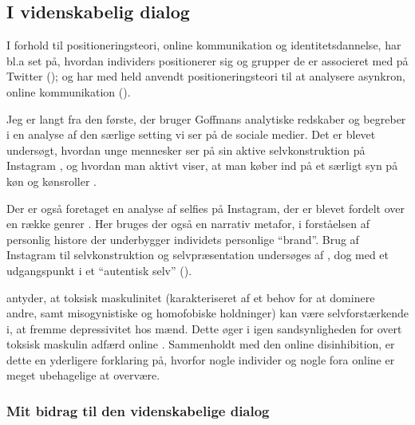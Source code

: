 \subsection{I videnskabelig dialog}

I forhold til positioneringsteori, online kommunikation og 
identitetsdannelse, har bl.a 
\citeauthor{lopezlongTweetingChoirReligious2012} set på, hvordan 
individers positionerer sig og grupper de er associeret med på 
Twitter (\citeyear{lopezlongTweetingChoirReligious2012}); og 
\citeauthor{dennenFacilitatorPresenceIdentity2011} har med held 
anvendt positioneringsteori til at analysere asynkron, online 
kommunikation (\citeyear{dennenFacilitatorPresenceIdentity2011}).

Jeg er langt fra den første, der bruger Goffmans analytiske 
redskaber og begreber i en analyse af den særlige setting vi ser 
på de sociale medier. Det er blevet undersøgt, hvordan unge 
mennesker ser på sin aktive selvkonstruktion på Instagram 
\autocite{seehaferNOFILTERExplorationInstagram2017a}, og hvordan 
man aktivt viser, at man køber ind på et særligt syn på køn og 
kønsroller \autocite{bakerGoodMorningFitfam2018}.

Der er også foretaget en analyse af selfies på Instagram, der er 
blevet fordelt over en række genrer 
\autocite{eagarClassifyingNarratedSelfie2016}. Her bruges der også 
en narrativ metafor, i forståelsen af personlig histore der 
underbygger individets personlige “brand”. Brug
af Instagram til selvkonstruktion og selvpræsentation undersøges 
af \citeauthor{lazebnaRoleCommunicationApprehension2015}, dog med 
et udgangspunkt i et “autentisk selv” 
(\citeyear{lazebnaRoleCommunicationApprehension2015}).

\citeauthor{parentSocialMediaBehavior2018} antyder, at toksisk 
maskulinitet (karakteriseret af et behov for at dominere andre, 
samt misogynistiske og homofobiske holdninger) kan være 
selvforstærkende i, at fremme depressivitet hos mænd. Dette øger i 
igen sandsynligheden for overt toksisk maskulin adfærd online 
\autocite{parentSocialMediaBehavior2018}. Sammenholdt med den 
online disinhibition, er dette en yderligere forklaring på, 
hvorfor nogle individer og nogle fora online er meget ubehagelige 
at overvære.

\subsubsection{Mit bidrag til den videnskabelige dialog}

